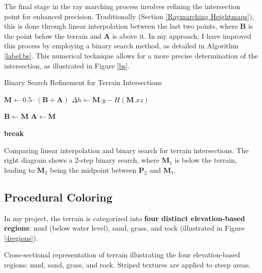 The final stage in the ray marching process involves refining the intersection point for enhanced precision. Traditionally (Section \ref{Raymarching Heightmaps}), this is done through linear interpolation between the last two points, where  $\mathbf{B}$ is the point below the terrain and $\mathbf{A}$ is above it. In my approach, I have improved this process by employing a binary search method, as detailed in Algorithm \ref{label:bs}. This numerical technique allows for a more precise determination of the intersection, as illustrated in Figure \ref{bs}.

\begin{algorithm}
\caption{Binary Search Refinement for Terrain Intersections}
\label{label:bs}
\begin{algorithmic}
        \State $\mathbf{M} \gets 0.5 \cdot (\mathbf{B} + \mathbf{A})$
        \State $\Delta h \gets \mathbf{M}.y - H(\mathbf{M}.xz)$

            \State $\mathbf{B} \gets \mathbf{M}$
        \Else
            \State $\mathbf{A} \gets \mathbf{M}$
        \EndIf

            \State \textbf{break}
        \EndIf
    \EndFor
\EndFunction
\end{algorithmic}
\end{algorithm}

{Comparing linear interpolation and binary search for terrain intersections. The right diagram shows a 2-step binary search, where $\mathbf{M}_1$ is below the terrain, leading to $\mathbf{M}_2$ being the midpoint between $\mathbf{P}_2$ and $\mathbf{M}_1$.}



\subsection{Procedural Coloring}
\label{Terrain Procedural Texturing}

In my project, the terrain is categorized into \textbf{four distinct elevation-based regions}: mud (below water level), sand, grass, and rock (illustrated in Figure \ref{4regions}).

{Cross-sectional representation of terrain illustrating the four elevation-based regions: mud, sand, grass, and rock. Striped textures are applied to steep areas.}

